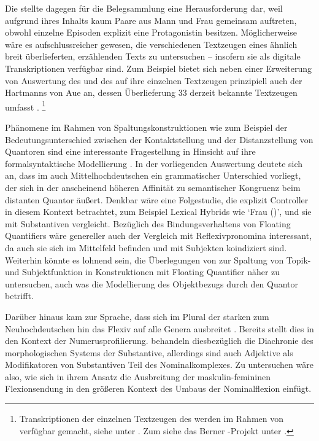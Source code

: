 Die \KC{} stellte dagegen für die Belegsammlung eine Herausforderung
dar, weil aufgrund ihres Inhalts kaum Paare aus Mann und Frau gemeinsam
auftreten, obwohl einzelne Episoden explizit eine Protagonistin besitzen.
Möglicherweise wäre es aufschlussreicher gewesen, die verschiedenen Textzeugen
eines ähnlich breit überlieferten, erzählenden Texts zu untersuchen -- insofern
sie als digitale Transkriptionen verfügbar sind. Zum Beispiel bietet sich neben
einer Erweiterung von  Auswertung des
 und des  auf ihre einzelnen Textzeugen prinzipiell
auch der  Hartmanns von Aue an, dessen Überlieferung 33 derzeit
bekannte Textzeugen umfasst \autocites[vgl.][s.\,v.~\textit{Hartmann von Aue:
}]{hsc}.%
%
	\footnote{Transkriptionen der einzelnen Textzeugen des  werden
		im Rahmen von  verfügbar gemacht, siehe unter
		. Zum  siehe das Berner
		-Projekt unter .%
	}

Phänomene im Rahmen von Spaltungskonstruktionen wie zum Beispiel der
Bedeutungs\-unterschied zwischen der Kontaktstellung und der Distanzstellung
von Quantoren sind eine interessante Fragestellung in Hinsicht auf ihre
formal\-syntaktische Modellierung \autocite[siehe
z.\,B.][]{pittner1995,merchant1996,fanselowcavar2002,nolda2007,shen2019}. In
der vorliegenden Auswertung deutete sich an, dass im auch
Mittelhochdeutschen ein grammatischer Unterschied
vorliegt, der sich in der anscheinend höheren Affinität zu semantischer
Kongruenz beim distanten Quantor äußert. Denkbar wäre eine Folgestudie, die
explizit  Controller in diesem Kontext betrachtet, zum
Beispiel Lexical Hybrids wie  `Frau (\NeutF)', und sie mit
 Substantiven vergleicht. Bezüglich des Bindungsverhaltens
von Floating Quantifiers wäre genereller auch der Vergleich mit
Reflexivpronomina interessant, da auch sie sich im Mittelfeld befinden und mit
Subjekten koindiziert sind. Weiterhin könnte es lohnend sein, die Überlegungen
von \citet{spector2009} zur Spaltung von Topik- und Subjektfunktion in
Konstruktionen mit Floating Quantifier näher zu untersuchen, auch was die
Modellierung des Objektbezugs durch den Quantor betrifft.

Darüber hinaus kam zur Sprache, dass sich im Plural der starken
 zum Neuhochdeutschen hin das
Flexiv  auf alle Genera ausbreitet
\autocite[vgl.][191--192]{reichmannwegera1993}. Bereits \citet{askedal1973}
stellt dies in den Kontext der Numerusprofilierung. \citet{dammelgillmann2014}
behandeln diesbezüglich die Diachronie des morphologischen Systems der
Substantive, allerdings sind auch Adjektive als Modifikatoren von Substantiven
Teil des Nominalkomplexes. Zu untersuchen wäre also, wie sich in ihrem Ansatz
die Ausbreitung der maskulin-femininen Flexionsendung in den größeren Kontext
des Umbaus der Nominal\-flexion einfügt.

